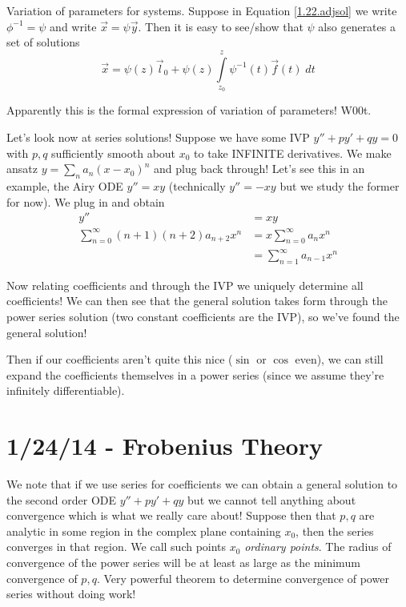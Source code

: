 \documentclass[10pt]{report}
\begin{document}
Variation of parameters for systems. Suppose in Equation \ref{1.22.adjsol} we write $\phi^{-1} = \psi$ and write $\vec{x} = \psi\vec{y}$. Then it is easy to see/show that $\psi$ also generates a set of solutions
\begin{equation}
    \vec{x} = \psi(z)\vec{l}_0 + \psi(z)\displaystyle\int\limits_{z_0}^{z}\psi^{-1}(t)\vec{f}(t)\;dt
    \label{1.22.adjsoly}
\end{equation}

Apparently this is the formal expression of variation of parameters! W00t.

Let's look now at series solutions! Suppose we have some IVP $y'' + py' + qy = 0$ with $p,q$ sufficiently smooth about $x_0$ to take INFINITE derivatives. We make ansatz $y = \sum_n a_n(x-x_0)^n$ and plug back through! Let's see this in an example, the Airy ODE $y'' = xy$ (technically $y'' = -xy$ but we study the former for now). We plug in and obtain
\begin{align}
    y'' &= xy\\
    \sum_{n=0}^{\infty}(n+1)(n+2)a_{n+2}x^n &= x\sum_{n=0}^{\infty}a_nx^n\\
    &= \sum_{n=1}^{\infty}a_{n-1}x^n
    \label{1.22.Airy}
\end{align}

Now relating coefficients and through the IVP we uniquely determine all coefficients! We can then see that the general solution takes form through the power series solution (two constant coefficients are the IVP), so we've found the general solution!

Then if our coefficients aren't quite this nice ($\sin$ or $\cos$ even), we can still expand the coefficients themselves in a power series (since we assume they're infinitely differentiable). 

\chapter{1/24/14 - Frobenius Theory}

We note that if we use series for coefficients we can obtain a general solution to the second order ODE $y'' + py' + qy$ but we cannot tell anything about convergence which is what we really care about! Suppose then that $p,q$ are analytic in some region in the complex plane containing $x_0$, then the series converges in that region. We call such points $x_0$ \emph{ordinary points}. The radius of convergence of the power series will be at least as large as the minimum convergence of $p,q$. Very powerful theorem to determine convergence of power series without doing work!
\end{document}
